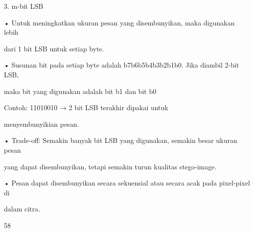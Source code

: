 \documentclass{article}
\begin{document}

3.  m-bit LSB 

• Untuk meningkatkan ukuran pesan yang disembunyikan, maka digunakan lebih 

dari 1 bit LSB untuk setiap byte.

• Susunan bit pada setiap byte adalah b7b6b5b4b3b2b1b0. Jika diambil 2-bit LSB, 

maka bit yang digunakan adalah bit b1 dan bit b0

 Contoh: 11010010 → 2 bit LSB terakhir dipakai untuk 




  menyembunyikian pesan.

• Trade-off: Semakin banyak bit LSB yang digunakan, semakin besar ukuran pesan 

yang dapat disembunyikan, tetapi semakin turun kualitas stego-image. 

• Pesan dapat disembunyikan secara sekuensial atau secara acak pada pixel-pixel di 

dalam citra.  



58
\end{document}
